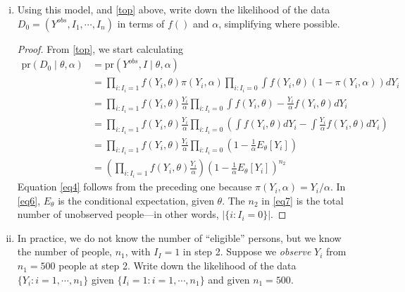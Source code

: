 \documentclass[letterpaper, 12pt]{article}
\newcommand{\pr}{\text{pr}}
\newcommand{\sbs}{\;|\;} %
\begin{document}
\begin{enumerate}[(i)]
\item
Using this model, and \eqref{top} above, write down the likelihood of the data $D_0 = (Y^{obs}, I_1, \cdots, I_n)$ in terms of $f()$ and $\alpha$, simplifying where possible.

\begin{proof}
From \eqref{top}, we start calculating
\begin{align}
\pr(D_0 \sbs \theta, \alpha) &= \pr(Y^{obs}, I \;|\; \theta, \alpha) \\
&= \prod_{i:I_i = 1} f(Y_i,\theta) \pi (Y_i, \alpha)
\prod_{i:I_i = 0} \int f(Y_i, \theta)(1 - \pi (Y_i,\alpha))dY_i \\
&= \prod_{i:I_i = 1} f(Y_i,\theta) \frac{Y_i}{ \alpha}
\prod_{i:I_i = 0} \int f(Y_i, \theta) - \frac{Y_i}{\alpha} f(Y_i, \theta) dY_i \label{eq4}\\
&= \prod_{i:I_i = 1} f(Y_i,\theta) \frac{Y_i}{ \alpha}
\prod_{i:I_i = 0} \left(\int f(Y_i, \theta) dY_i - \int \frac{Y_i}{\alpha} f(Y_i, \theta) dY_i \right) \\
&= \prod_{i:I_i = 1} f(Y_i,\theta) \frac{Y_i}{ \alpha}
\prod_{i:I_i = 0} \left(1 - \frac{1}{\alpha} E_\theta[Y_i] \right) 
\label{eq6}\\
&= \left(\prod_{i:I_i = 1} f(Y_i,\theta) \frac{Y_i}{ \alpha} \right)
\left(1 - \frac{1}{\alpha} E_\theta[Y_i] \right)^{n_2} \label{eq7}
\end{align}
Equation \eqref{eq4} follows from the preceding one because $\pi(Y_i, \alpha) = Y_i / \alpha$. In \eqref{eq6}, $E_{\theta}$ is the conditional expectation, given $\theta$. The $n_2$ in \eqref{eq7} is the total number of unobserved people---in other words, $|\{i : I_i = 0\}|$.
\end{proof}

\item
In practice, we do not know the number of ``eligible'' persons, but we know the number of people, $n_1$, with $I_I = 1$ in step 2. 
Suppose we \textit{observe} $Y_i$ from $n_1 = 500$ people at step 2.
Write down the likelihood of the data $\{Y_i : i = 1, \cdots, n_1\}$ given $\{I_i = 1 : i = 1, \cdots, n_1\}$ and given $n_1 = 500$. 


\end{enumerate}
\end{document}
